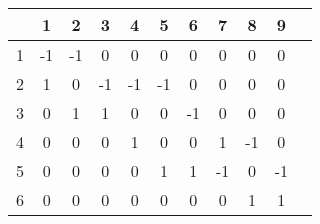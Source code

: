 \begin{tabular}{c|cccccccccc}
	& 1 & 2 & 3 & 4 & 5 & 6 & 7 & 8 & 9 \\
	\hline
	1 & -1 & -1 & 0 & 0 & 0 & 0 & 0 & 0 & 0 \\
	2 & 1 & 0 & -1 & -1 & -1 & 0 & 0 & 0 & 0 \\
	3 & 0 & 1 & 1 & 0 & 0 & -1 & 0 & 0 & 0 \\
	4 & 0 & 0 & 0 & 1 & 0 & 0 & 1 & -1 & 0 \\
	5 & 0 & 0 & 0 & 0 & 1 & 1 & -1 & 0 & -1 \\
	6 & 0 & 0 & 0 & 0 & 0 & 0 & 0 & 1 & 1 \\
\end{tabular}
